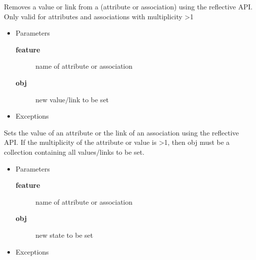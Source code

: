 \begin{desc}Removes a value or link from a (attribute or association) using the
 reflective API. Only valid for attributes and associations with
 multiplicity \textgreater  1
\begin{itemize}
\item{Parameters
  \begin{description}
   \item[{\bf feature}]{name of attribute or association}
   \item[{\bf obj}]{new value$/$link to be set}
  \end{description}}
\end{itemize}
\begin{itemize}
\item{{Exceptions}
}
\end{itemize}
\end{desc}

\begin{desc}Sets the value of an attribute or the link of an association using the
 reflective API. If the multiplicity of the attribute or value is \textgreater  1,
 then obj must be a collection containing all values$/$links to be set.
\begin{itemize}
\item{Parameters
  \begin{description}
   \item[{\bf feature}]{name of attribute or association}
   \item[{\bf obj}]{new state to be set}
  \end{description}}
\end{itemize}
\begin{itemize}
\item{{Exceptions}
}
\end{itemize}
\end{desc}

